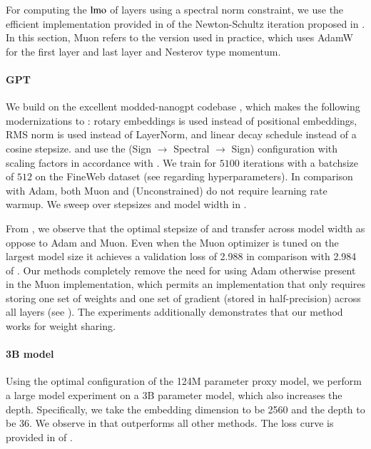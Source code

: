 

For computing the $\operatorname{lmo}$ of layers using a spectral norm constraint, we use the efficient implementation provided in \citet{jordan2024muon} of the Newton-Schultz iteration proposed in \citet{bernstein2024old}.
In this section, Muon \citep{jordan2024muon} refers to the version used in practice, which uses AdamW for the first layer and last layer and Nesterov type momentum.



\paragraph{GPT}
We build on the excellent modded-nanogpt codebase \citep{modded_nanogpt_2024}, which makes the following modernizations to \citet{karpathy2023nanogpt}: rotary embeddings is used instead of positional embeddings, RMS norm is used instead of LayerNorm, and linear decay schedule instead of a cosine stepsize.
\Scion and \uScion use the (Sign $\rightarrow$ Spectral $\rightarrow$ Sign) configuration with scaling factors in accordance with .
We train for $5100$ iterations with a batchsize of $512$ on the FineWeb dataset (see  regarding hyperparameters).
In comparison with Adam, both Muon and ({\sc Unconstrained}) \Scion do not require learning rate warmup.
We sweep over stepsizes and model width in .

From , we observe that the optimal stepsize of \Scion and \uScion transfer across model width as oppose to Adam and Muon.
Even when the Muon optimizer is tuned on the largest model size it achieves a validation loss of 2.988 in comparison with 2.984 of \uScion.
Our methods completely remove the need for using Adam otherwise present in the Muon implementation, which permits an implementation that only requires storing one set of weights and one set of gradient (stored in half-precision) across all layers (see ).
The experiments additionally demonstrates that our method works for weight sharing.

\paragraph{3B model}
Using the optimal configuration of the 124M parameter proxy model, we perform a large model experiment on a 3B parameter model, which also increases the depth.
Specifically, we take the embedding dimension to be 2560 and the depth to be 36.
We observe in  that \uScion outperforms all other methods.
The loss curve is provided in  of .

